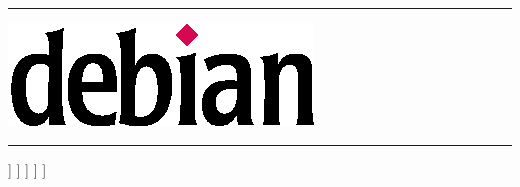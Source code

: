\begin{minipage}{.98\textwidth}
%
\hspace{-\Separation}%
\smash{\rule[-\textheight]{1pt}{\textheight}}%
\hspace{-1pt}%
\rule{1.04\textwidth}{1pt}

\vspace*{\Separation}
%
\begin{minipage}{.39\textwidth}

\vspace*{\Separation}

\WhatIsDebian
\end{minipage}
%
\hfill
%
\begin{minipage}{.59\textwidth}
\includegraphics[width=\textwidth]{debian} \\[1ex]
\resizebox*{\textwidth}{!}{\bf \Universal}
\end{minipage}

\vspace*{\Separation}

\hspace{-\Separation}%
\rule{1.04\textwidth}{1pt}

\vspace*{\Separation}

\begin{minipage}[t]{.44\textwidth}
%
\begin{description}\itemsep0cm
\Descriptionsymbol\FreedomCaption] \Freedom
\Descriptionsymbol\CommunityCaption] \Community
\Descriptionsymbol\ContinuityCaption] \Continuity
\Descriptionsymbol\StabilityCaption] \Stability
\Descriptionsymbol\PortabilityCaption] \Portability
\end{description}
%
\end{minipage}
%
\hfill
%
\begin{minipage}[t]{.54\textwidth}
%
\colorbox{debianred}{\textcolor{white}{\bf\Large \IncludedCaption}}

\vspace*{\Separation}


\end{minipage}
\end{minipage}
